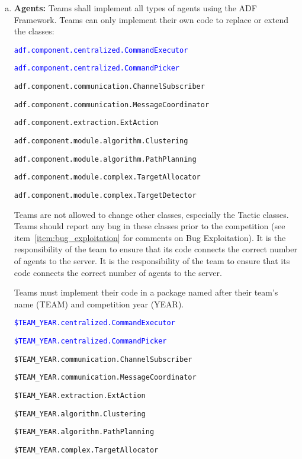 \documentclass{article}
\begin{document}
\begin{enumerate}[(a)]
\item \textbf{Agents:} Teams shall implement all types of agents using the ADF Framework. Teams can only implement their own code to replace or extend the classes:

\small
\texttt{\textcolor{blue}{adf.component.centralized.CommandExecutor}}

\texttt{\textcolor{blue}{adf.component.centralized.CommandPicker}}

\texttt{adf.component.communication.ChannelSubscriber}

\texttt{adf.component.communication.MessageCoordinator}

\texttt{adf.component.extraction.ExtAction}

\texttt{adf.component.module.algorithm.Clustering}

\texttt{adf.component.module.algorithm.PathPlanning}

\texttt{adf.component.module.complex.TargetAllocator}

\texttt{adf.component.module.complex.TargetDetector}

\normalsize
Teams are not allowed to change other classes, especially the Tactic classes. Teams should report any bug in these classes prior to the competition (see item~\ref{item:bug_exploitation} for comments on Bug Exploitation). It is the responsibility of the team to ensure that its code connects the correct number of agents to the server. It is the responsibility of the team to ensure that its code connects the correct number of agents to the server.

Teams must implement their code in a package named after their team's name (TEAM) and competition year (YEAR).

\small

\texttt{\textcolor{blue}{\$TEAM\_YEAR.centralized.CommandExecutor}}

\texttt{\textcolor{blue}{\$TEAM\_YEAR.centralized.CommandPicker}}

\texttt{\$TEAM\_YEAR.communication.ChannelSubscriber}

\texttt{\$TEAM\_YEAR.communication.MessageCoordinator}

\texttt{\$TEAM\_YEAR.extraction.ExtAction}

\texttt{\$TEAM\_YEAR.algorithm.Clustering}

\texttt{\$TEAM\_YEAR.algorithm.PathPlanning}

\texttt{\$TEAM\_YEAR.complex.TargetAllocator}


\end{enumerate}
\end{document}
